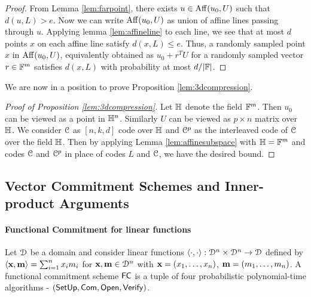 \begin{proof}
	From Lemma \ref{lem:farpoint}, there exists $u\in {\rm Aff}({u_0},{U})$ such that $d(u,L)>e$. Now we can write ${\rm Aff}({u_0},{U})$ as union of affine lines passing through $u$. Applying lemma \ref{lem:affineline} to each line, we see that at most $d$ points $x$ on each affine line satisfy $d(x,L)\leq e$. Thus, a randomly sampled point $x$ in ${\rm Aff}({u_0},{U})$, equivalently obtained as $u_0+r^TU$ for a randomly sampled vector $r\in \mathbb{F}^m$ satisfies $d(x,L)$ with probability at most $d/|\mathbb{F}|$.
\end{proof}
We are now in a position to prove Proposition \ref{lem:3dcompression}.
\begin{proof}[Proof of Proposition \ref{lem:3dcompression}]
	Let $\mathbb{H}$ denote the field $\mathbb{F}^m$. Then $u_0$ can be viewed as a point in
	$\mathbb{H}^n$. Similarly $U$ can be viewed as $p\times n$ matrix over $\mathbb{H}$.
	We consider $\mathcal{C}$ as $[n,k,d]$ code over $\mathbb{H}$ and $\mathcal{C}^p$ as the
	interleaved code of $\mathcal{C}$ over the field $\mathbb{H}$. Then by applying Lemma \ref{lem:affinesubspace}
	with $\mathbb{H}=\mathbb{F}^m$ and codes $\mathcal{C}$ and $\mathcal{C}^p$ in place of codes $L$ and	$\mathcal{C}$, we have the desired bound.
\end{proof}

\subsection{Vector Commitment Schemes and Inner-product Arguments}
\paragraph*{Functional Commitment for linear functions}

Let $\mathcal{D}$ be a domain and consider linear functions $\langle \cdot,\cdot\rangle : \mathcal{D}^n \times \mathcal{D}^n \rightarrow \mathcal{D}$ defined by $\langle {\bf x},{\bf m}\rangle = \sum_{i=1}^n x_im_i$ for ${\bf x, m} \in  \mathcal{D}^n$ with ${\bf x} = (x_1, \ldots , x_n)$, ${\bf m} = (m_1, \ldots, m_n)$. 
A functional commitment scheme $\mathsf{FC}$ is a tuple of four probabilistic polynomial-time algorithms - $(\mathsf{SetUp}, \mathsf{Com}, \mathsf{Open}, \mathsf{Verify})$.

